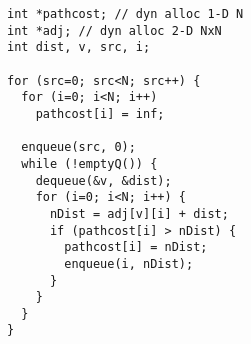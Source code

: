 \begin{lstlisting}[morekeywords={pathcost}, belowskip=0pt, firstnumber=1]
int *pathcost; // dyn alloc 1-D N
int *adj; // dyn alloc 2-D NxN
int dist, v, src, i;

for (src=0; src<N; src++) {
  for (i=0; i<N; i++)
    pathcost[i] = inf;

  enqueue(src, 0);
  while (!emptyQ()) {
    dequeue(&v, &dist);
    for (i=0; i<N; i++) {
      nDist = adj[v][i] + dist;
      if (pathcost[i] > nDist) {
        pathcost[i] = nDist;
        enqueue(i, nDist);
      }
    }
  }
}
\end{lstlisting}
